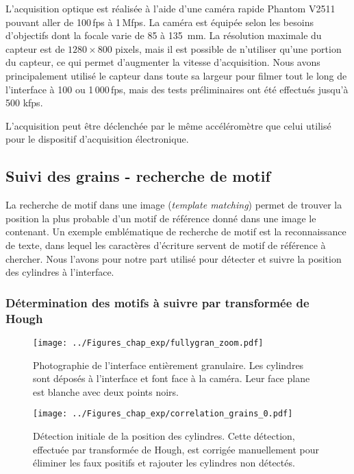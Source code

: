 L'acquisition optique est réalisée à l'aide d'une caméra rapide Phantom V2511 pouvant aller de 100\,fps à 1\,Mfps. La caméra est équipée selon les besoins d'objectifs dont la focale varie de 85 à \SI{135}{\milli\meter}. La résolution maximale du capteur est de $1280\times800$ pixels, mais il est possible de n'utiliser qu'une portion du capteur, ce qui permet d'augmenter la vitesse d'acquisition. Nous avons principalement utilisé le capteur dans toute sa largeur pour filmer tout le long de l'interface à 100 ou 1\,000\,fps, mais des tests préliminaires ont été effectués jusqu'à 500 kfps.

L'acquisition peut être déclenchée par le même accéléromètre que celui utilisé pour le dispositif d'acquisition électronique.


\newpage

\subsection{Suivi des grains - recherche de motif}
\label{sec:suividesgrains}

La recherche de motif dans une image (\textit{template matching}) permet de trouver la position la plus probable d'un motif de référence donné dans une image le contenant. Un exemple emblématique de recherche de motif est la reconnaissance de texte, dans lequel les caractères d'écriture servent de motif de référence à chercher. Nous l'avons pour notre part utilisé pour détecter et suivre la position des cylindres à l'interface.




\subsubsection{Détermination des motifs à suivre par transformée de Hough}
\label{sec:paint}



\begin{figure}[htb]
\centering	
\texttt{[image: ../Figures\_chap\_exp/fullygran\_zoom.pdf]}
\caption[Interface entièrement granulaire]{Photographie de l'interface entièrement granulaire. Les cylindres sont déposés à l'interface et font face à la caméra. Leur face plane est blanche avec deux points noirs.}
\label{fig:facegrains}
\end{figure}



\begin{figure}[htb]
\centering	
\texttt{[image: ../Figures\_chap\_exp/correlation\_grains\_0.pdf]}
\caption[Détection des grains par transformée de Hough]{Détection initiale de la position des cylindres. Cette détection, effectuée par transformée de Hough, est corrigée manuellement pour éliminer les faux positifs et rajouter les cylindres non détectés.}
\label{fig:hough}
\end{figure}



